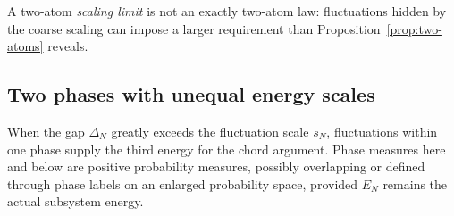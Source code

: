 A two-atom \emph{scaling limit} is not an exactly two-atom law:
fluctuations hidden by the coarse scaling can impose a larger
requirement than Proposition~\ref{prop:two-atoms} reveals.

\subsection{Two phases with unequal energy scales}

When the gap $\Delta_N$ greatly exceeds the fluctuation scale $s_N$,
fluctuations within one phase supply the third energy for the chord
argument. Phase measures here and below are positive probability
measures, possibly overlapping or defined through phase labels on an
enlarged probability space, provided $E_N$ remains the actual
subsystem energy.

